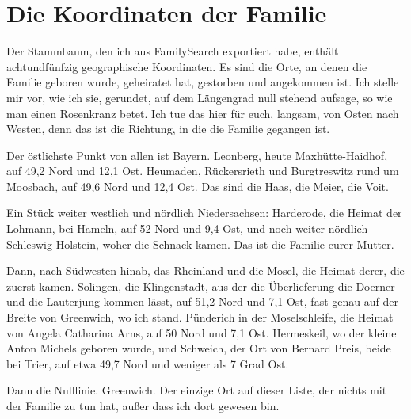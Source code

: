 \documentclass[
  ngerman,
  11pt,
  openany]{book}
\begin{document}
\section{Die Koordinaten der Familie}\label{die-koordinaten-der-familie}

Der Stammbaum, den ich aus FamilySearch exportiert habe, enthält
achtundfünfzig geographische Koordinaten. Es sind die Orte, an denen die
Familie geboren wurde, geheiratet hat, gestorben und angekommen ist. Ich
stelle mir vor, wie ich sie, gerundet, auf dem Längengrad null stehend
aufsage, so wie man einen Rosenkranz betet. Ich tue das hier für euch,
langsam, von Osten nach Westen, denn das ist die Richtung, in die die
Familie gegangen ist.

Der östlichste Punkt von allen ist Bayern. Leonberg, heute
Maxhütte-Haidhof, auf 49,2 Nord und 12,1 Ost. Heumaden, Rückersrieth und
Burgtreswitz rund um Moosbach, auf 49,6 Nord und 12,4 Ost. Das sind die
Haas, die Meier, die Voit.

Ein Stück weiter westlich und nördlich Niedersachsen: Harderode, die
Heimat der Lohmann, bei Hameln, auf 52 Nord und 9,4 Ost, und noch weiter
nördlich Schleswig-Holstein, woher die Schnack kamen. Das ist die
Familie eurer Mutter.

Dann, nach Südwesten hinab, das Rheinland und die Mosel, die Heimat
derer, die zuerst kamen. Solingen, die Klingenstadt, aus der die
Überlieferung die Doerner und die Lauterjung kommen lässt, auf 51,2 Nord
und 7,1 Ost, fast genau auf der Breite von Greenwich, wo ich stand.
Pünderich in der Moselschleife, die Heimat von Angela Catharina Arns,
auf 50 Nord und 7,1 Ost. Hermeskeil, wo der kleine Anton Michels geboren
wurde, und Schweich, der Ort von Bernard Preis, beide bei Trier, auf
etwa 49,7 Nord und weniger als 7 Grad Ost.

Dann die Nulllinie. Greenwich. Der einzige Ort auf dieser Liste, der
nichts mit der Familie zu tun hat, außer dass ich dort gewesen bin.
\end{document}
